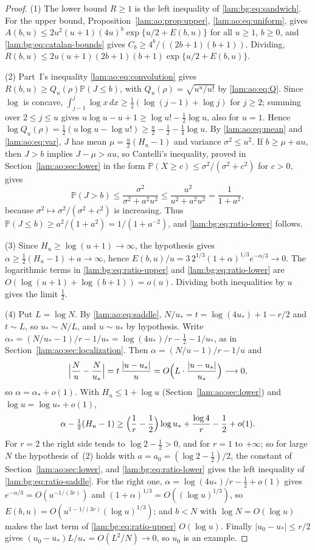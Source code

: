 \documentclass[11pt,a4paper]{article}
\numberwithin{equation}{section}
\theoremstyle{remark}
\newcommand{\Prob}{\mathbb P}
\begin{document}
\begin{proof}
(1) The lower bound $R\ge1$ is the left inequality of \eqref{lam:bg:eq:sandwich}. For the upper bound, Proposition~\ref{lam:ao:prop:upper}, \eqref{lam:ao:eq:uniform}, gives $A(b,u)\le2u^2(u+1)(4u)^b\exp\{u/2+E(b,u)\}$ for all $u\ge1$, $b\ge0$, and \eqref{lam:bg:eq:catalan-bounds} gives $C_b\ge4^b/((2b+1)(b+1))$. Dividing, $R(b,u)\le2u(u+1)(2b+1)(b+1)\exp\{u/2+E(b,u)\}$.

(2) Part~I's inequality \eqref{lam:ao:eq:convolution} gives $R(b,u)\ge Q_u(\rho)\Prob(J\le b)$, with $Q_u(\rho)=\sqrt{u^u/u!}$ by \eqref{lam:ao:eq:Q}. Since $\log$ is concave, $\int_{j-1}^j\log x\,dx\ge\frac12(\log(j-1)+\log j)$ for $j\ge2$; summing over $2\le j\le u$ gives $u\log u-u+1\ge\log u!-\frac12\log u$, also for $u=1$. Hence $\log Q_u(\rho)=\frac12(u\log u-\log u!)\ge\frac u2-\frac12-\frac14\log u$. By \eqref{lam:ao:eq:mean} and \eqref{lam:ao:eq:var}, $J$ has mean $\mu=\frac u2(H_u-1)$ and variance $\sigma^2\le u^2$. If $b\ge\mu+au$, then $J>b$ implies $J-\mu>au$, so Cantelli's inequality, proved in Section~\ref{lam:ao:sec:lower} in the form $\Prob(X\ge c)\le\sigma^2/(\sigma^2+c^2)$ for $c>0$, gives
\[
 \Prob(J>b)\le\frac{\sigma^2}{\sigma^2+a^2u^2}\le\frac{u^2}{u^2+a^2u^2}=\frac1{1+a^2},
\]
because $\sigma^2\mapsto\sigma^2/(\sigma^2+c^2)$ is increasing. Thus $\Prob(J\le b)\ge a^2/(1+a^2)=1/(1+a^{-2})$, and \eqref{lam:bg:eq:ratio-lower} follows.

(3) Since $H_u\ge\log(u+1)\to\infty$, the hypothesis gives $\alpha\ge\frac12(H_u-1)+a\to\infty$, hence $E(b,u)/u=3\,2^{1/3}(1+\alpha)^{1/3}e^{-\alpha/3}\to0$. The logarithmic terms in \eqref{lam:bg:eq:ratio-upper} and \eqref{lam:bg:eq:ratio-lower} are $O(\log(u+1)+\log(b+1))=o(u)$. Dividing both inequalities by $u$ gives the limit $\frac12$.

(4) Put $L=\log N$. By \eqref{lam:ao:eq:saddle}, $N/u_*=t=\log(4u_*)+1-r/2$ and $t\sim L$, so $u_*\sim N/L$, and $u\sim u_*$ by hypothesis. Write $\alpha_*=(N/u_*-1)/r-1/u_*=\log(4u_*)/r-\frac12-1/u_*$, as in Section~\ref{lam:ao:sec:localization}. Then $\alpha=(N/u-1)/r-1/u$ and
\[
 \Bigl|\frac Nu-\frac N{u_*}\Bigr|=t\,\frac{|u-u_*|}{u}=O\Bigl(L\cdot\frac{|u-u_*|}{u_*}\Bigr)\longrightarrow0,
\]
so $\alpha=\alpha_*+o(1)$. With $H_u\le1+\log u$ (Section~\ref{lam:ao:sec:lower}) and $\log u=\log u_*+o(1)$,
\[
 \alpha-\tfrac12(H_u-1)\ge\Bigl(\frac1r-\frac12\Bigr)\log u_*+\frac{\log4}r-\frac12+o(1).
\]
For $r=2$ the right side tends to $\log2-\frac12>0$, and for $r=1$ to $+\infty$; so for large $N$ the hypothesis of~(2) holds with $a=a_0=(\log2-\frac12)/2$, the constant of Section~\ref{lam:ao:sec:lower}, and \eqref{lam:bg:eq:ratio-lower} gives the left inequality of \eqref{lam:bg:eq:ratio-saddle}. For the right one, $\alpha=\log(4u_*)/r-\frac12+o(1)$ gives $e^{-\alpha/3}=O(u^{-1/(3r)})$ and $(1+\alpha)^{1/3}=O((\log u)^{1/3})$, so $E(b,u)=O(u^{1-1/(3r)}(\log u)^{1/3})$; and $b<N$ with $\log N=O(\log u)$ makes the last term of \eqref{lam:bg:eq:ratio-upper} $O(\log u)$. Finally $|u_0-u_*|\le r/2$ gives $(u_0-u_*)L/u_*=O(L^2/N)\to0$, so $u_0$ is an example.
\end{proof}
\end{document}

